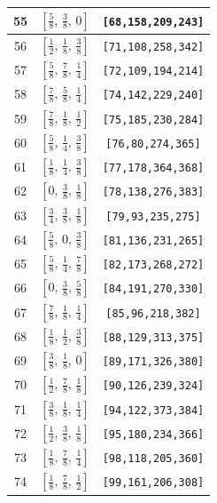 \documentclass[fleqn,8pt]{jsarticle}
\begin{document}
\begin{longtable}{ccc}
55 & $\left[ \frac{5}{8},\, \frac{3}{8},\, 0 \right]$ & {\tt [68,158,209,243]} \\ \hline
56 & $\left[ \frac{1}{2},\, \frac{1}{8},\, \frac{3}{8} \right]$ & {\tt [71,108,258,342]} \\ \hline
57 & $\left[ \frac{5}{8},\, \frac{7}{8},\, \frac{1}{4} \right]$ & {\tt [72,109,194,214]} \\ \hline
58 & $\left[ \frac{7}{8},\, \frac{5}{8},\, \frac{1}{4} \right]$ & {\tt [74,142,229,240]} \\ \hline
59 & $\left[ \frac{7}{8},\, \frac{1}{8},\, \frac{1}{2} \right]$ & {\tt [75,185,230,284]} \\ \hline
60 & $\left[ \frac{5}{8},\, \frac{1}{4},\, \frac{3}{8} \right]$ & {\tt [76,80,274,365]} \\ \hline
61 & $\left[ \frac{1}{8},\, \frac{1}{4},\, \frac{3}{8} \right]$ & {\tt [77,178,364,368]} \\ \hline
62 & $\left[ 0,\, \frac{3}{8},\, \frac{1}{8} \right]$ & {\tt [78,138,276,383]} \\ \hline
63 & $\left[ \frac{3}{4},\, \frac{3}{8},\, \frac{1}{8} \right]$ & {\tt [79,93,235,275]} \\ \hline
64 & $\left[ \frac{5}{8},\, 0,\, \frac{3}{8} \right]$ & {\tt [81,136,231,265]} \\ \hline
65 & $\left[ \frac{5}{8},\, \frac{1}{4},\, \frac{7}{8} \right]$ & {\tt [82,173,268,272]} \\ \hline
66 & $\left[ 0,\, \frac{3}{8},\, \frac{5}{8} \right]$ & {\tt [84,191,270,330]} \\ \hline
67 & $\left[ \frac{7}{8},\, \frac{1}{8},\, \frac{1}{4} \right]$ & {\tt [85,96,218,382]} \\ \hline
68 & $\left[ \frac{1}{8},\, \frac{1}{2},\, \frac{3}{8} \right]$ & {\tt [88,129,313,375]} \\ \hline
69 & $\left[ \frac{3}{8},\, \frac{1}{8},\, 0 \right]$ & {\tt [89,171,326,380]} \\ \hline
70 & $\left[ \frac{1}{2},\, \frac{7}{8},\, \frac{1}{8} \right]$ & {\tt [90,126,239,324]} \\ \hline
71 & $\left[ \frac{3}{8},\, \frac{1}{8},\, \frac{1}{4} \right]$ & {\tt [94,122,373,384]} \\ \hline
72 & $\left[ \frac{1}{2},\, \frac{3}{8},\, \frac{1}{8} \right]$ & {\tt [95,180,234,366]} \\ \hline
73 & $\left[ \frac{1}{8},\, \frac{7}{8},\, \frac{1}{4} \right]$ & {\tt [98,118,205,360]} \\ \hline
74 & $\left[ \frac{1}{8},\, \frac{7}{8},\, \frac{1}{2} \right]$ & {\tt [99,161,206,308]} \\ \hline

\end{longtable}
\end{document}
